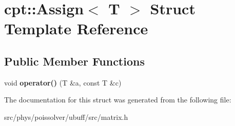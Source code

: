 \hypertarget{structcpt_1_1Assign}{}\section{cpt\+:\+:Assign$<$ T $>$ Struct Template Reference}
\label{structcpt_1_1Assign}
\subsection*{Public Member Functions}
\begin{DoxyCompactItemize}
\item 
void {\bfseries operator()} (T \&a, const T \&c)\hypertarget{structcpt_1_1Assign_ac91654b1509591d129c3eda0cd051632}{}\label{structcpt_1_1Assign_ac91654b1509591d129c3eda0cd051632}

\end{DoxyCompactItemize}


The documentation for this struct was generated from the following file\+:\begin{DoxyCompactItemize}
\item 
src/phys/poissolver/ubuff/src/matrix.\+h\end{DoxyCompactItemize}
